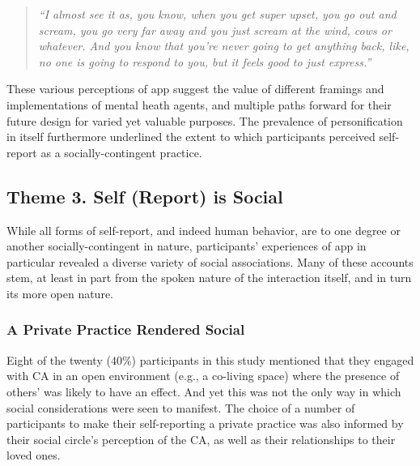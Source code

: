                 \begin{quote}
                \vspace{2mm}
                    \textit{``I almost see it as, you know, when you get super upset, you go out and scream, you go very far away and you just scream at the wind, cows or whatever. And you know that you're never going to get anything back, like, no one is going to respond to you, but it feels good to just express.''} %
                \vspace{2mm}
                \end{quote} 
            
            These various perceptions of \acl{app} suggest the value of different framings and implementations of mental heath agents, and multiple paths forward for their future design for varied yet valuable purposes. The prevalence of personification in itself furthermore underlined the extent to which participants perceived self-report as a socially-contingent practice.        

    \subsection{Theme 3. Self (Report) is Social}
    
        While all forms of self-report, and indeed human behavior, are to one degree or another socially-contingent in nature, participants' experiences of \ac{app} in particular revealed a diverse variety of social associations. Many of these accounts stem, at least in part from the spoken nature of the interaction itself, and in turn its more open nature.

        \subsubsection{A Private Practice Rendered Social} %
            
            Eight of the twenty ($40\%$) participants in this study mentioned that they engaged with \ac{CA} in an open environment (e.g., a co-living space) where the presence of others' was likely to have an effect. And yet this was not the only way in which social considerations were seen to manifest. The choice of a number of participants to make their self-reporting a private practice was also informed by their social circle's perception of the \ac{CA}, as well as their relationships to their loved ones.
            
